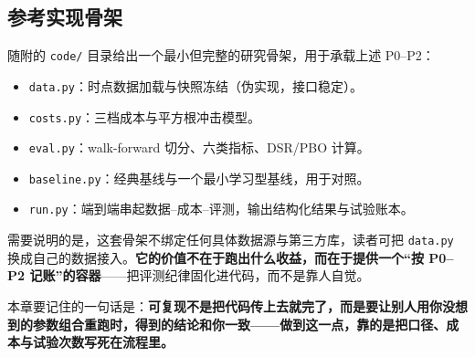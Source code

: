 \subsection{参考实现骨架}

随附的 \texttt{code/} 目录给出一个最小但完整的研究骨架，用于承载上述 P0--P2：

\begin{itemize}
  \item \texttt{data.py}：时点数据加载与快照冻结（伪实现，接口稳定）。
  \item \texttt{costs.py}：三档成本与平方根冲击模型。
  \item \texttt{eval.py}：walk-forward 切分、六类指标、DSR/PBO 计算。
  \item \texttt{baseline.py}：经典基线与一个最小学习型基线，用于对照。
  \item \texttt{run.py}：端到端串起数据--成本--评测，输出结构化结果与试验账本。
\end{itemize}

需要说明的是，这套骨架不绑定任何具体数据源与第三方库，读者可把 \texttt{data.py} 换成自己的数据接入。\textbf{它的价值不在于跑出什么收益，而在于提供一个“按 P0--P2 记账”的容器}——把评测纪律固化进代码，而不是靠人自觉。

本章要记住的一句话是：\textbf{可复现不是把代码传上去就完了，而是要让别人用你没想到的参数组合重跑时，得到的结论和你一致——做到这一点，靠的是把口径、成本与试验次数写死在流程里。}
